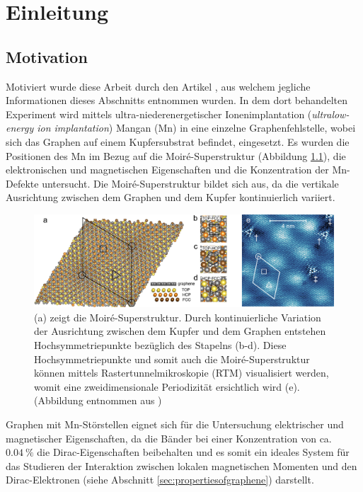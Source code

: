 \chapter{Einleitung}
\section{Motivation}
\label{sec:motivation}
Motiviert wurde diese Arbeit durch den Artikel \cite{doi:10.1021/acsnano.1c00139}, aus welchem jegliche Informationen dieses 
Abschnitts entnommen wurden.
In dem dort behandelten Experiment wird mittels ultra-niederenergetischer Ionenimplantation
(\textit{ultralow-energy ion implantation}) Mangan (Mn) in eine einzelne Graphenfehlstelle, wobei sich das Graphen auf einem Kupfersubstrat befindet, eingesetzt.
Es wurden die Positionen des Mn im Bezug auf die Moiré-Superstruktur (Abbildung \ref{fig:ascnano_structure}), die elektronischen und magnetischen Eigenschaften und die Konzentration der Mn-Defekte
untersucht.
Die Moiré-Superstruktur bildet sich aus, da die vertikale Ausrichtung zwischen dem Graphen und dem Kupfer kontinuierlich variiert.
\begin{figure}[H]
    \centering
    \includegraphics[width = 0.95 \textwidth]{Plots/images_large_nn1c00139_0002.jpeg}
    \caption{(a) zeigt die Moiré-Superstruktur. Durch kontinuierliche Variation der Ausrichtung 
    zwischen dem Kupfer und dem Graphen entstehen Hochsymmetriepunkte bezüglich des Stapelns (b-d).
    Diese Hochsymmetriepunkte und somit auch die Moiré-Superstruktur können mittels Rastertunnelmikroskopie (RTM) 
    visualisiert werden, womit eine zweidimensionale Periodizität ersichtlich wird (e).
    (Abbildung entnommen  aus \cite{doi:10.1021/acsnano.1c00139})}
    \label{fig:ascnano_structure}
\end{figure}
Graphen mit Mn-Störstellen eignet sich für die Untersuchung elektrischer und magnetischer Eigenschaften, da die Bänder bei einer Konzentration von ca. $\qty{0.04}{\percent}$ 
die Dirac-Eigenschaften beibehalten und es somit ein ideales System für das Studieren der Interaktion
zwischen lokalen magnetischen Momenten und den Dirac-Elektronen (siehe Abschnitt \ref{sec:propertiesofgraphene}) darstellt.
